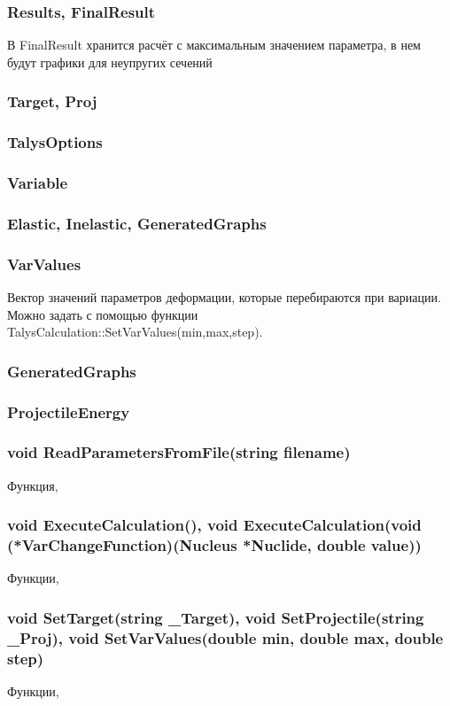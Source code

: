 \documentclass[a4paper,12pt]{extarticle}
\begin{document}
\subsubsection{Results, FinalResult}
В FinalResult хранится расчёт с максимальным значением параметра, в нем будут графики для неупругих сечений
\subsubsection{Target, Proj}

\subsubsection{TalysOptions}

\subsubsection{Variable}

\subsubsection{Elastic, Inelastic, GeneratedGraphs}

\subsubsection{VarValues}
Вектор значений параметров деформации, которые перебираются при вариации. Можно задать с помощью функции TalysCalculation::SetVarValues(min,max,step).
\subsubsection{GeneratedGraphs}

\subsubsection{ProjectileEnergy}

\subsubsection{void ReadParametersFromFile(string filename)}
Функция, 
\subsubsection{void ExecuteCalculation(), void ExecuteCalculation(void (*VarChangeFunction)(Nucleus *Nuclide, double value))}
Функции, 
\subsubsection{void SetTarget(string _Target), void SetProjectile(string _Proj), void SetVarValues(double min, double max, double step)}
Функции, 
\end{document}

